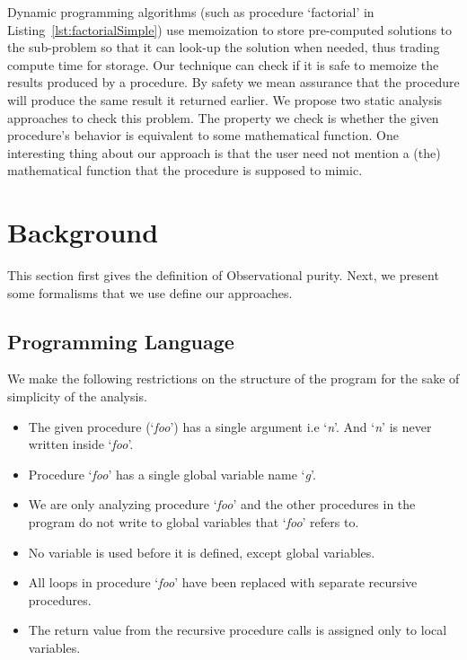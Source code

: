 \documentclass{llncs}
\newcommand{\foo}{\textit{foo}}
\newcommand{\n}{\textit{n}}
\newcommand{\g}{\textit{g}}
\begin{document}

Dynamic programming algorithms (such as procedure `factorial' in
Listing~\ref{lst:factorialSimple}) use memoization to store
pre-computed solutions to the sub-problem so that it can look-up the
solution when needed, thus trading compute time for storage. Our
technique can check if it is safe to memoize the results produced by a
procedure. By safety we mean assurance that the procedure will produce
the same result it returned earlier. We propose two static analysis
approaches to check this problem. The property we check is whether the
given procedure's behavior is equivalent to some mathematical
function. One interesting thing about our approach is that the user
need not mention a (the) mathematical function that the procedure is
supposed to mimic.


\section{Background} \label{sec:background}
This section first gives the definition of Observational purity. Next,
we present some formalisms that we use define our approaches.

\subsection{Programming Language}
We make the following restrictions on the structure of the program for
the sake of simplicity of the analysis.

\begin{itemize}
\item The given procedure (`\foo') has a single argument i.e `\n'. And
  `\n' is never written inside `\foo'.
\item Procedure `\foo' has a single global variable name `\g'.
\item We are only analyzing procedure `\foo' and the other procedures
  in the program do not write to global variables that `\foo' refers
  to.
\item No variable is used before it is defined, except global
  variables.
\item All loops in procedure `\foo' have been replaced with separate
  recursive procedures.
\item The return value from the recursive procedure calls is assigned
  only to local variables.
\end{itemize}
\end{document}
